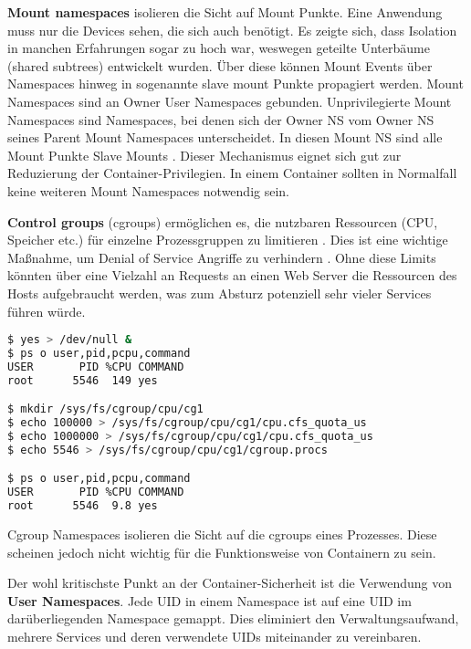\textbf{Mount namespaces} isolieren die Sicht auf Mount Punkte. Eine Anwendung muss nur die Devices sehen, die sich auch benötigt. Es zeigte sich, dass Isolation in manchen Erfahrungen sogar zu hoch war, weswegen geteilte Unterbäume (shared subtrees) entwickelt wurden. Über diese können Mount Events über Namespaces hinweg in sogenannte slave mount Punkte propagiert werden. Mount Namespaces sind an Owner User Namespaces gebunden. Unprivilegierte Mount Namespaces sind Namespaces, bei denen sich der Owner NS vom Owner NS seines Parent Mount Namespaces
unterscheidet. In diesen Mount NS sind alle Mount Punkte Slave Mounts \cite{man-mount-ns}. Dieser Mechanismus eignet sich gut zur Reduzierung der Container-Privilegien. In einem Container sollten in Normalfall keine weiteren Mount Namespaces notwendig sein.

\textbf{Control groups} (cgroups) ermöglichen es, die nutzbaren Ressourcen (CPU, Speicher etc.) für einzelne Prozessgruppen zu limitieren \cite{man-cgroups}. Dies ist eine wichtige Maßnahme, um Denial of Service Angriffe zu verhindern \cite{lxc-sec}. Ohne diese Limits könnten über eine Vielzahl an Requests an einen Web Server die Ressourcen des Hosts aufgebraucht werden, was zum Absturz potenziell sehr vieler Services führen würde.

\begin{lstlisting}[language=sh,caption={Ressourcenlimitierung einer DoS-Attacke (durch \texttt{yes} mimiert) mithilfe von cgroups}]
$ yes > /dev/null &
$ ps o user,pid,pcpu,command
USER       PID %CPU COMMAND
root      5546  149 yes

$ mkdir /sys/fs/cgroup/cpu/cg1
$ echo 100000 > /sys/fs/cgroup/cpu/cg1/cpu.cfs_quota_us
$ echo 1000000 > /sys/fs/cgroup/cpu/cg1/cpu.cfs_quota_us
$ echo 5546 > /sys/fs/cgroup/cpu/cg1/cgroup.procs

$ ps o user,pid,pcpu,command
USER       PID %CPU COMMAND
root      5546  9.8 yes
\end{lstlisting}

Cgroup Namespaces isolieren die Sicht auf die cgroups eines Prozesses. Diese scheinen jedoch nicht wichtig für die Funktionsweise von Containern zu sein.

Der wohl kritischste Punkt an der Container-Sicherheit ist die Verwendung von \textbf{User Namespaces}. Jede UID in einem Namespace ist auf eine UID im darüberliegenden Namespace gemappt. Dies eliminiert den Verwaltungsaufwand, mehrere Services und deren verwendete UIDs miteinander zu vereinbaren.

